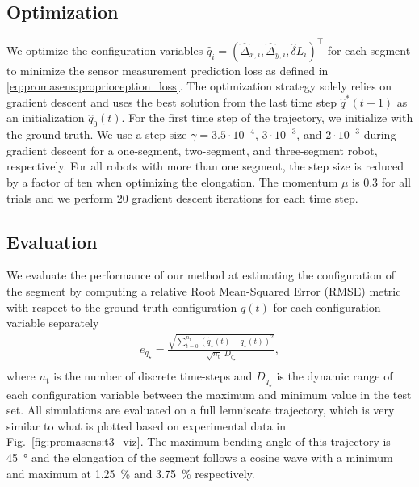 \subsection{Optimization}
We optimize the configuration variables $\hat{q}_i = (\hat{\Delta}_{x,i}, \hat{\Delta}_{y,i}, \hat{\delta} L_{i})^\top$ for each segment to minimize the sensor measurement prediction loss as defined in \eqref{eq:promasens:proprioception_loss}.
The optimization strategy solely relies on gradient descent and uses the best solution from the last time step $\hat{q}^*(t-1)$ as an initialization $\hat{q}_0(t)$. For the first time step of the trajectory, we initialize with the ground truth.
We use a step size $\gamma = 3.5 \cdot 10^{-4}$, $3 \cdot 10^{-3}$, and $2 \cdot 10^{-3}$ during gradient descent for a one-segment, two-segment, and three-segment robot, respectively. For all robots with more than one segment, the step size is reduced by a factor of ten when optimizing the elongation. The momentum $\mu$ is $0.3$ for all trials and we perform $20$ gradient descent iterations for each time step.

\subsection{Evaluation}\label{sub:promasens:pcc_simulations:evaluation}
We evaluate the performance of our method at estimating the configuration of the segment by computing a relative Root Mean-Squared Error (RMSE) metric with respect to the ground-truth configuration $q(t)$ for each configuration variable separately
\begin{equation}\label{eq:promasens:relative_RMSE}
\begin{split}
    e_{q_\star} = \frac{\sqrt{\sum_{t=0}^{n_\mathrm{t}} \left ( \hat{q}_\star(t) - q_\star(t) \right )^2}}{\sqrt{n_\mathrm{t}} \; D_{q_\star}},\\
\end{split}
\end{equation}
where $n_\mathrm{t}$ is the number of discrete time-steps and $D_{q_\star}$ is the dynamic range of each configuration variable between the maximum and minimum value in the test set.
All simulations are evaluated on a full lemniscate trajectory, which is very similar to what is plotted based on experimental data in Fig.~\ref{fig:promasens:t3_viz}. The maximum bending angle of this trajectory is \SI{45}{\degree} and the elongation of the segment follows a cosine wave with a minimum and maximum at \SI{1.25}{\percent} and \SI{3.75}{\percent} respectively.

